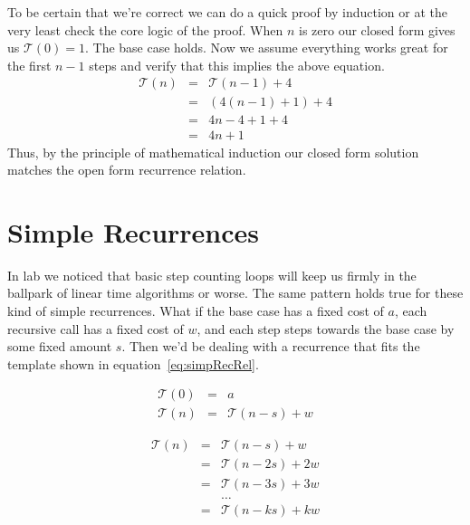 \documentclass[nobib]{tufte-handout}
\begin{document}
To be certain that we're correct we can do a quick proof by induction or at the very least check the core logic of the proof.  When $n$ is zero our closed form gives us $\mathcal{T}(0) = 1$. The base case holds. Now we assume everything works great for the first $n-1$ steps and verify that this implies the above equation.
\begin{equation*}
  \begin{array}{rcl}
    \mathcal{T}(n) &=& \mathcal{T}(n-1) + 4 \\
    &=& (4(n-1) + 1)  + 4 \\
    &=& 4n - 4 + 1 + 4 \\
    &=& 4n + 1
  \end{array}
\end{equation*}
Thus, by the principle of mathematical induction our closed form solution matches the open form recurrence relation.

\section{Simple Recurrences}

In lab we noticed that basic step counting loops will keep us firmly in the ballpark of linear time algorithms or worse. The same pattern holds true for these kind of simple recurrences. What if the base case has a fixed cost of $a$, each recursive call has a fixed cost of $w$, and each step steps towards the base case by some fixed amount $s$. Then we'd be dealing with a recurrence that fits the template shown in equation~\ref{eq:simpRecRel}.

\begin{equation}
  \begin{array}{rcl}
    \mathcal{T}(0) &=& a \\
    \mathcal{T}(n) &=& \mathcal{T}(n-s) + w
  \end{array}
\label{eq:simpRecRel}
\end{equation}

\begin{equation}
  \begin{array}{rcl}
    \mathcal{T}(n) &=& \mathcal{T}(n-s) + w \\
    &=& \mathcal{T}(n-2s) + 2w \\
    &=& \mathcal{T}(n-3s) + 3w \\
    && \ldots \\
    &=& \mathcal{T}(n-ks) + kw
  \end{array}
\label{eq:simpRecRel}
\end{equation}
\end{document}
